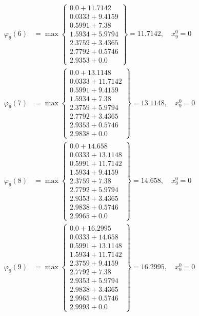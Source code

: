 \documentclass{article}
\begin{document}
\begin{align*}
  
  
  
\varphi_{9}(6) &= \max \left\{ \begin{array}{c}
0.0 + 11.7142 \\
 0.0333 + 9.4159 \\
 0.5991 + 7.38 \\
 1.5934 + 5.9794 \\
 2.3759 + 3.4365 \\
 2.7792 + 0.5746 \\
 2.9353 + 0.0
\end{array} \right\}=11.7142,\quad x_{9}^0=0\\
  
  
  
  
\varphi_{9}(7) &= \max \left\{ \begin{array}{c}
0.0 + 13.1148 \\
 0.0333 + 11.7142 \\
 0.5991 + 9.4159 \\
 1.5934 + 7.38 \\
 2.3759 + 5.9794 \\
 2.7792 + 3.4365 \\
 2.9353 + 0.5746 \\
 2.9838 + 0.0
\end{array} \right\}=13.1148,\quad x_{9}^0=0\\
  
  
  
  
\varphi_{9}(8) &= \max \left\{ \begin{array}{c}
0.0 + 14.658 \\
 0.0333 + 13.1148 \\
 0.5991 + 11.7142 \\
 1.5934 + 9.4159 \\
 2.3759 + 7.38 \\
 2.7792 + 5.9794 \\
 2.9353 + 3.4365 \\
 2.9838 + 0.5746 \\
 2.9965 + 0.0
\end{array} \right\}=14.658,\quad x_{9}^0=0\\
  
  
  
  
\varphi_{9}(9) &= \max \left\{ \begin{array}{c}
0.0 + 16.2995 \\
 0.0333 + 14.658 \\
 0.5991 + 13.1148 \\
 1.5934 + 11.7142 \\
 2.3759 + 9.4159 \\
 2.7792 + 7.38 \\
 2.9353 + 5.9794 \\
 2.9838 + 3.4365 \\
 2.9965 + 0.5746 \\
 2.9993 + 0.0
\end{array} \right\}=16.2995,\quad x_{9}^0=0\\
  

\end{align*}
\end{document}
